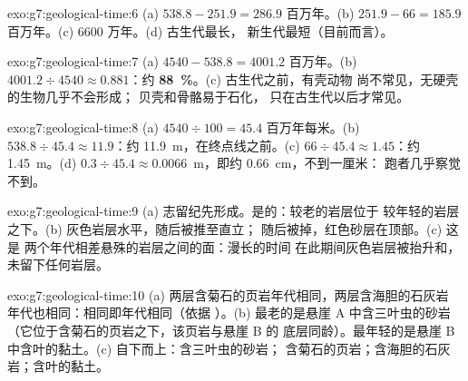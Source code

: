 \begin{solution}{exo:g7:geological-time:6}
(a) $538.8 - 251.9 = 286.9$ 百万年。(b) $251.9 - 66 = 185.9$
百万年。(c) 6600 万年。(d) 古生代最长，
新生代最短（目前而言）。
\end{solution}

\begin{solution}{exo:g7:geological-time:7}
(a) $4540 - 538.8 = 4001.2$ 百万年。(b) $4001.2 \div 4540
\approx 0.881$：约 \textbf{88~\%}。(c) 古生代之前，有壳动物
尚不常见，无硬壳的生物几乎不会形成；
贝壳和骨骼易于石化，
只在古生代以后才常见。
\end{solution}

\begin{solution}{exo:g7:geological-time:8}
(a) $4540 \div 100 = 45.4$ 百万年每米。(b) $538.8 \div 45.4
\approx 11.9$：约 \qty{11.9}{m}，在终点线之前。(c) $66 \div
45.4 \approx 1.45$：约 \qty{1.45}{m}。(d) $0.3 \div 45.4 \approx
0.0066$~m，即约 \qty{0.66}{cm}，不到一厘米：
跑者几乎察觉不到。
\end{solution}

\begin{solution}{exo:g7:geological-time:9}
(a) 志留纪先形成。是的：较老的岩层位于
较年轻的岩层之下。(b) 灰色岩层水平，随后被推至直立；
随后被掉，红色砂层在顶部。(c) 这是
两个年代相差悬殊的岩层之间的面：漫长的时间
在此期间灰色岩层被抬升和，
未留下任何岩层。
\end{solution}

\begin{solution}{exo:g7:geological-time:10}
(a) 两层含菊石的页岩年代相同，两层含海胆的石灰岩
年代也相同：相同即年代相同（依据
）。(b) 最老的是悬崖 A 中含三叶虫的砂岩
（它位于含菊石的页岩之下，该页岩与悬崖 B 的
底层同龄）。最年轻的是悬崖
B 中含叶的黏土。(c) 自下而上：含三叶虫的砂岩；
含菊石的页岩；含海胆的石灰岩；含叶的黏土。
\end{solution}

